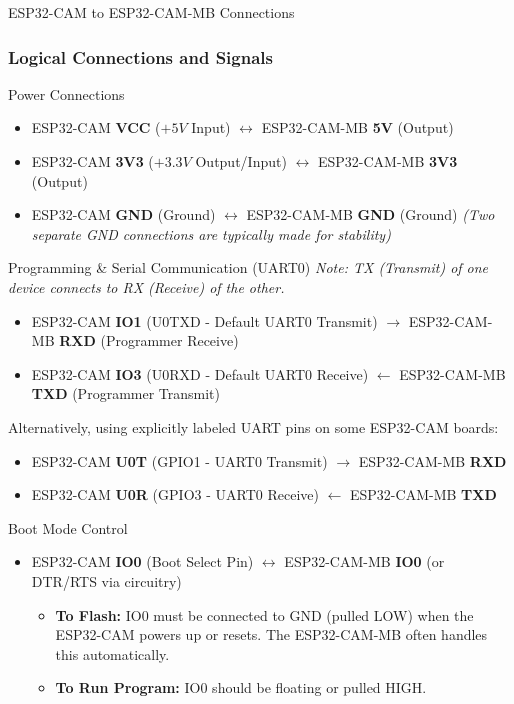 \documentclass{beamer}
\begin{document}
\begin{frame}{ESP32-CAM to ESP32-CAM-MB Connections}
  \frametitle{Logical Connections and Signals}

  \begin{block}{Power Connections}
    \begin{itemize}
        \item ESP32-CAM \textbf{VCC} ($+5V$ Input) $\longleftrightarrow$ ESP32-CAM-MB \textbf{5V} (Output)
        \item ESP32-CAM \textbf{3V3} ($+3.3V$ Output/Input) $\longleftrightarrow$ ESP32-CAM-MB \textbf{3V3} (Output)
        \item ESP32-CAM \textbf{GND} (Ground) $\longleftrightarrow$ ESP32-CAM-MB \textbf{GND} (Ground) \textit{(Two separate GND connections are typically made for stability)}
    \end{itemize}
  \end{block}

  \begin{block}{Programming \& Serial Communication (UART0)}
    \textit{Note: TX (Transmit) of one device connects to RX (Receive) of the other.}
    \begin{itemize}
        \item ESP32-CAM \textbf{IO1} (U0TXD - Default UART0 Transmit) $\longrightarrow$ ESP32-CAM-MB \textbf{RXD} (Programmer Receive)
        \item ESP32-CAM \textbf{IO3} (U0RXD - Default UART0 Receive) $\longleftarrow$ ESP32-CAM-MB \textbf{TXD} (Programmer Transmit)
    \end{itemize}
    Alternatively, using explicitly labeled UART pins on some ESP32-CAM boards:
    \begin{itemize}
        \item ESP32-CAM \textbf{U0T} (GPIO1 - UART0 Transmit) $\longrightarrow$ ESP32-CAM-MB \textbf{RXD}
        \item ESP32-CAM \textbf{U0R} (GPIO3 - UART0 Receive) $\longleftarrow$ ESP32-CAM-MB \textbf{TXD}
    \end{itemize}
  \end{block}

  \begin{block}{Boot Mode Control}
    \begin{itemize}
        \item ESP32-CAM \textbf{IO0} (Boot Select Pin) $\longleftrightarrow$ ESP32-CAM-MB \textbf{IO0} (or DTR/RTS via circuitry)
        \begin{itemize}
            \item \textbf{To Flash:} IO0 must be connected to GND (pulled LOW) when the ESP32-CAM powers up or resets. The ESP32-CAM-MB often handles this automatically.
            \item \textbf{To Run Program:} IO0 should be floating or pulled HIGH.
        \end{itemize}
    \end{itemize}
  \end{block}
  

\end{frame}
\end{document}
